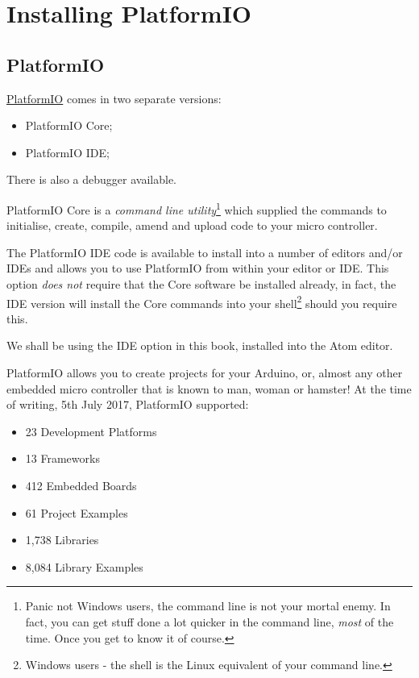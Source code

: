 \chapter{Installing PlatformIO}\label{installing-platformio}

\section{PlatformIO}\label{platformio}

\href{http://platformio.org/}{PlatformIO} comes in two separate versions:

\begin{itemize}
	\item PlatformIO Core;
	\item PlatformIO IDE;
\end{itemize}	

There is also a debugger available. 

PlatformIO Core is a \emph{command line utility}\footnote{Panic
not Windows users, the command line is not your mortal enemy. In fact,
you can get stuff done a lot quicker in the command line, \emph{most}
of the time. Once you get to know it of course.} which supplied the commands to initialise, create, compile, amend and upload code to your micro controller. 

The PlatformIO IDE code is available to install into a number of editors and/or IDEs and allows you to use PlatformIO from within your editor or IDE. This option \emph{does not} require that the Core software be installed already, in fact, the IDE version will install the Core commands into your shell\footnote{Windows users - the shell is the Linux equivalent of your command line.} should you require this.

We shall be using the IDE option in this book, installed into the Atom editor.

PlatformIO allows you to create projects for your Arduino, or, almost any other embedded micro controller that is known to man, woman or hamster! At the time of writing, 5th July 2017, PlatformIO supported:

\begin{itemize}
\item
  23 Development Platforms
\item
  13 Frameworks
\item
  412 Embedded Boards
\item
  61 Project Examples
\item
  1,738 Libraries
\item
  8,084 Library Examples
\end{itemize}

